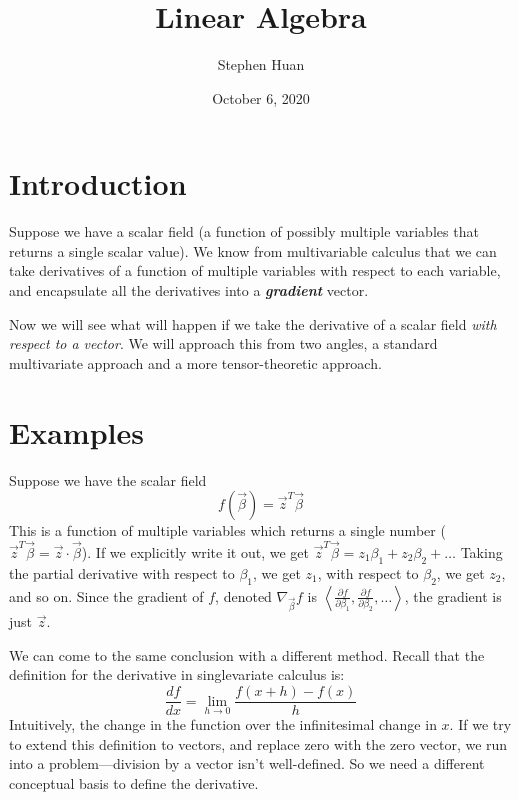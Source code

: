 \documentclass[11pt, oneside]{article}
\title{Linear Algebra}
\author{Stephen Huan}
\date{October 6, 2020}
\newcommand{\emphasis}[1]{\textbf{\textit{#1}}}
\begin{document}
\maketitle

\section{Introduction}
Suppose we have a scalar field (a function of possibly multiple variables that
returns a single scalar value). We know from multivariable calculus that we can
take derivatives of a function of multiple variables with respect to each
variable, and encapsulate all the derivatives into a \emphasis{gradient} vector.

Now we will see what will happen if we take the derivative of a scalar field
\textit{with respect to a vector}. We will approach this from two angles,
a standard multivariate approach and a more tensor-theoretic approach.

\section{Examples}

Suppose we have the scalar field \[ f(\vec{\beta}) = \vec{z}^T \vec{\beta} \]
This is a function of multiple variables which returns a single number
(\( \vec{z}^T \vec{\beta} = \vec{z} \cdot \vec{\beta} \)).
If we explicitly write it out, we get
\( \vec{z}^T \vec{\beta} = z_1 \beta_1 + z_2 \beta_2 + \dots \)
Taking the partial derivative with respect to \( \beta_1 \), we get
\( z_1 \), with respect to \( \beta_2 \), we get \( z_2 \), and so on.
Since the gradient of \( f \), denoted \( \nabla_{\vec{\beta}} f \) is
\( \left\langle \frac{\partial f}{\partial \beta_1}, \frac{\partial f}{\partial \beta_2}, \ldots \right\rangle \),
the gradient is just \( \vec{z} \).

We can come to the same conclusion with a different method.
Recall that the definition for the derivative in singlevariate calculus is:
\[ \frac{df}{dx} = \lim_{h \to 0} \frac{f(x + h) - f(x)}{h} \]
Intuitively, the change in the function
over the infinitesimal change in \( x \).
If we try to extend this definition to vectors, and replace zero with the zero
vector, we run into a problem---division by a vector isn't well-defined.
So we need a different conceptual basis to define the derivative.

\newpage
\end{document}
